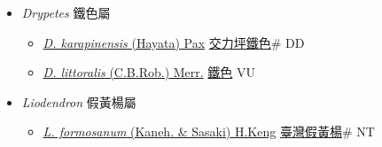 
  \begin{itemize}
 \item[] \textit{Drypetes} 鐵色屬
                    
  \begin{itemize}
        \item[] \href{http://www.theplantlist.org/tpl1.1/search?q=Drypetes+karapinensis}{\textit{D. karapinensis} (Hayata) Pax}   \href{\detokenize{http://taibnet.sinica.edu.tw/chi/taibnet_species_list.php?T2=交力坪鐵色&T2_new_value=true&fr=y}}{交力坪鐵色}\# DD
        \item[] \href{http://www.theplantlist.org/tpl1.1/search?q=Drypetes+littoralis}{\textit{D. littoralis} (C.B.Rob.) Merr.}   \href{\detokenize{http://taibnet.sinica.edu.tw/chi/taibnet_species_list.php?T2=鐵色&T2_new_value=true&fr=y}}{鐵色} VU
  \end{itemize}
 \item[] \textit{Liodendron} 假黃楊屬
                    
  \begin{itemize}
        \item[] \href{http://www.theplantlist.org/tpl1.1/search?q=Liodendron+formosanum}{\textit{L. formosanum} (Kaneh. \& Sasaki) H.Keng}   \href{\detokenize{http://taibnet.sinica.edu.tw/chi/taibnet_species_list.php?T2=臺灣假黃楊&T2_new_value=true&fr=y}}{臺灣假黃楊}\# NT
  \end{itemize}
  \end{itemize}
